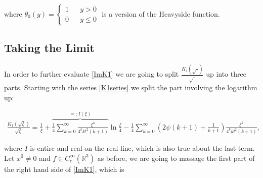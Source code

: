 \documentclass[a4paper,11pt]{article}
\begin{document}
where \(\theta_0(y)=\left\{\begin{matrix} 1 && y>0 \\ 0 && y\le 0 \end{matrix} \right.\) is a version of the Heavyside function.

\subsection{Taking the Limit}

In order to further evaluate \eqref{ImK1} we are going to split \(\frac{K_1(\sqrt{\cdot})}{\sqrt{\cdot}}\) up into three parts. 
Starting with the series \eqref{K1series} we split the part involving the logarithm up:

\begin{align}
\frac{K_1(\sqrt{\xi})}{\sqrt{\xi}}=\frac{1}{\xi} +   \overbrace{\frac{1}{4}\sum_{k=0}^\infty \frac{\xi^k}{4^k k!^2 (k+1)}}^{=:I(\xi)} \ln \frac{\xi}{4}
-\frac{1}{4}\sum_{k=0}^\infty \left(2\psi(k+1) + \frac{1}{k+1}\right) \frac{\xi^k}{4^k k!^2 (k+1)},
\end{align}

where \(I\) is entire and real on the real line, which is also true about the last term.
Let \(x^0\neq 0\) and \(f\in C_c^\infty(\mathbb{R}^3)\) as before, 
we are going to massage the first part of the right hand side of \eqref{ImK1}, which is
\end{document}
